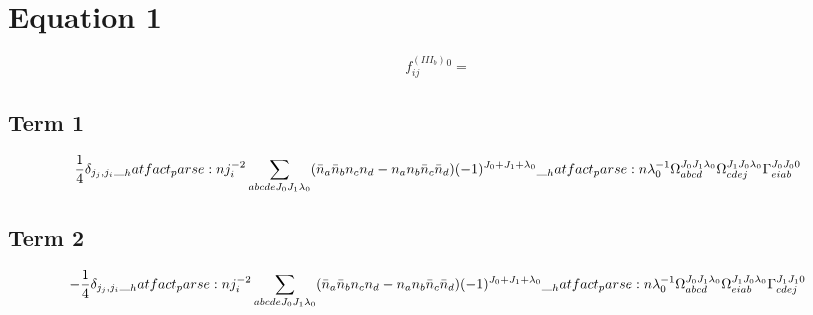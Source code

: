 \documentclass{scrartcl}
\begin{document}
\section{Equation 1}
\begin{dmath*}
f^{(III_b)}_{i j}^{0} = 
\end{dmath*}
\subsection{Term 1}
\begin{dmath*}
\frac{1}{4} \* \delta_{{j}_{j},{j}_{i}} \* \hatfact{{j}_{i}^{-2}} \* \sum_{a b c d e {J}_{0} {J}_{1} {{\lambda}}_{0}} \* (\bar{n}_{a} \* \bar{n}_{b} \* n_{c} \* n_{d} -n_{a} \* n_{b} \* \bar{n}_{c} \* \bar{n}_{d}) \* (-1)^{{J}_{0}+{J}_{1}+{{\lambda}}_{0}} \* \hatfact{{{\lambda}}_{0}^{-1}} \* \Omega_{a b c d}^{{J}_{0} {J}_{1} {{\lambda}}_{0}} \* \Omega_{c d e j}^{{J}_{1} {J}_{0} {{\lambda}}_{0}} \* \Gamma_{e i a b}^{{J}_{0} {J}_{0} 0}
\end{dmath*}
\subsection{Term 2}
\begin{dmath*}
-\frac{1}{4} \* \delta_{{j}_{j},{j}_{i}} \* \hatfact{{j}_{i}^{-2}} \* \sum_{a b c d e {J}_{0} {J}_{1} {{\lambda}}_{0}} \* (\bar{n}_{a} \* \bar{n}_{b} \* n_{c} \* n_{d} -n_{a} \* n_{b} \* \bar{n}_{c} \* \bar{n}_{d}) \* (-1)^{{J}_{0}+{J}_{1}+{{\lambda}}_{0}} \* \hatfact{{{\lambda}}_{0}^{-1}} \* \Omega_{a b c d}^{{J}_{0} {J}_{1} {{\lambda}}_{0}} \* \Omega_{e i a b}^{{J}_{1} {J}_{0} {{\lambda}}_{0}} \* \Gamma_{c d e j}^{{J}_{1} {J}_{1} 0}
\end{dmath*}
\end{document}
